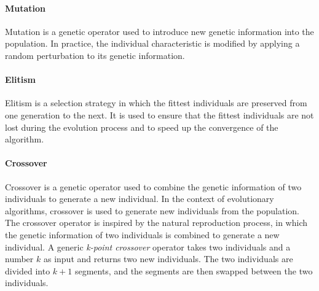 \paragraph{Mutation}

Mutation is a genetic operator used to introduce new genetic information into the population. In practice, the individual characteristic is modified by applying a random perturbation to its genetic information.

\paragraph{Elitism}

Elitism is a selection strategy in which the fittest individuals are preserved from one generation to the next. It is used to ensure that the fittest individuals are not lost during the evolution process and to speed up the convergence of the algorithm.

\paragraph{Crossover}

Crossover is a genetic operator used to combine the genetic information of two individuals to generate a new individual. In the context of evolutionary algorithms, crossover is used to generate new individuals from the population. The crossover operator is inspired by the natural reproduction process, in which the genetic information of two individuals is combined to generate a new individual. A generic \textit{k-point crossover} operator takes two individuals and a number $k$ as input and returns two new individuals. The two individuals are divided into $k+1$ segments, and the segments are then swapped between the two individuals.